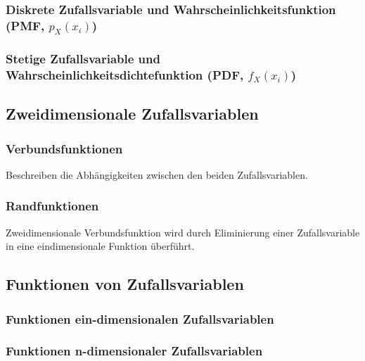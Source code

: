 \subsubsection{Diskrete Zufallsvariable und Wahrscheinlichkeitsfunktion (PMF, $p_X(x_i)$) }
\subsubsection{Stetige Zufallsvariable und Wahrscheinlichkeitsdichtefunktion (PDF, $f_X(x_i)$) }
\vspace{0.25cm}

\subsection{Zweidimensionale Zufallsvariablen }

\subsubsection{Verbundsfunktionen }
\vspace{-0.2cm}
\hspace*{0.2cm} Beschreiben die Abhängigkeiten zwischen den beiden Zufallsvariablen.
\vspace{-\baselineskip}
\subsubsection{Randfunktionen }
\vspace{-0.2cm}
\hspace*{0.2cm} Zweidimensionale Verbundsfunktion wird durch Eliminierung einer Zufallsvariable in eine eindimensionale Funktion überführt.
\vspace{-2\baselineskip}

\subsection{Funktionen von Zufallsvariablen }
\subsubsection{Funktionen ein-dimensionalen Zufallsvariablen }
\subsubsection{Funktionen n-dimensionaler Zufallsvariablen }
\vspace{0.25cm}

